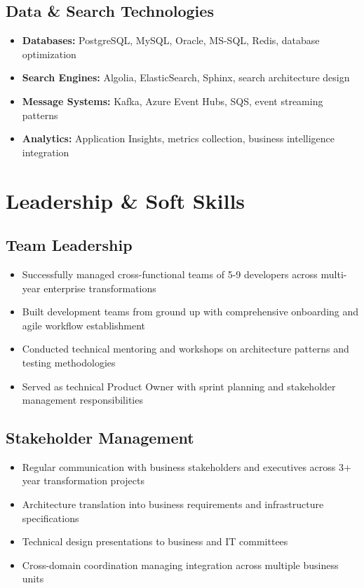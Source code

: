 \documentclass[11pt,a4paper]{article}
\begin{document}
\subsection{Data \& Search Technologies}
\begin{itemize}[leftmargin=12pt,topsep=0pt,itemsep=0pt]
\item \textbf{Databases:} PostgreSQL, MySQL, Oracle, MS-SQL, Redis, database optimization
\item \textbf{Search Engines:} Algolia, ElasticSearch, Sphinx, search architecture design
\item \textbf{Message Systems:} Kafka, Azure Event Hubs, SQS, event streaming patterns
\item \textbf{Analytics:} Application Insights, metrics collection, business intelligence integration
\end{itemize}

\section{Leadership \& Soft Skills}

\subsection{Team Leadership}
\begin{itemize}[leftmargin=12pt,topsep=0pt,itemsep=0pt]
\item Successfully managed cross-functional teams of 5-9 developers across multi-year enterprise transformations
\item Built development teams from ground up with comprehensive onboarding and agile workflow establishment
\item Conducted technical mentoring and workshops on architecture patterns and testing methodologies
\item Served as technical Product Owner with sprint planning and stakeholder management responsibilities
\end{itemize}

\subsection{Stakeholder Management}
\begin{itemize}[leftmargin=12pt,topsep=0pt,itemsep=0pt]
\item Regular communication with business stakeholders and executives across 3+ year transformation projects
\item Architecture translation into business requirements and infrastructure specifications
\item Technical design presentations to business and IT committees
\item Cross-domain coordination managing integration across multiple business units
\end{itemize}
\end{document}
